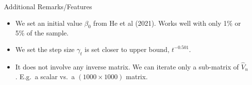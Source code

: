 \documentclass[beamer, t]{beamer}
\begin{document}

\begin{frame}{Additional Remarks/Features}
	
	\begin{itemize}
		\item 
		We set an initial value $\beta_0$ from He et al (2021). Works well with only 1\% or 5\% of the sample. 
		
		\item We set the step size $ \gamma_{t} $ is set closer to upper bound, $ t^{-0.501} $. 

		\item It does not involve any inverse matrix. We can iterate only a sub-matrix of $\widehat{V}_n$. E.g.~a scalar vs.~a $(1000\times 1000)$ matrix.
	\end{itemize}
	
\end{frame}
\end{document}
